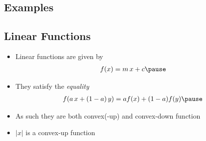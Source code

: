 
\begin{slide}
\section[-2]{Examples}

\pb\pause
{}
\begin{center}
  \pause
\end{center}
\end{slide}


\begin{slide}
\section[-2]{Linear Functions}

\begin{PauseHighLight}
  \begin{itemize}
  \item Linear functions are given by
    \begin{align*}
      f(x) = m\,x + c\pause
    \end{align*}
  \item They satisfy the \emph{equality}
    \begin{align*}
      f(a \,x + (1-a)\, y) = a f(x) + (1-a) f(y)\pause
    \end{align*}
  \item As such they are both convex(-up) and convex-down
    function\pause    
  \item $|x|$ is a convex-up function \pause
  \end{itemize}
\end{PauseHighLight}

\end{slide}



